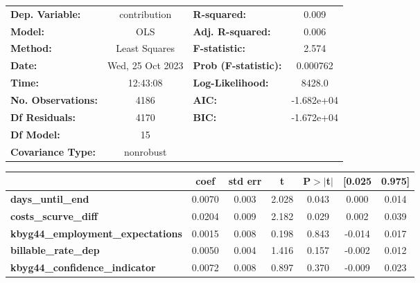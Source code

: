 \begin{center}
\begin{tabular}{lclc}
\toprule
\textbf{Dep. Variable:}                   &   contribution   & \textbf{  R-squared:         } &     0.009   \\
\textbf{Model:}                           &       OLS        & \textbf{  Adj. R-squared:    } &     0.006   \\
\textbf{Method:}                          &  Least Squares   & \textbf{  F-statistic:       } &     2.574   \\
\textbf{Date:}                            & Wed, 25 Oct 2023 & \textbf{  Prob (F-statistic):} &  0.000762   \\
\textbf{Time:}                            &     12:43:08     & \textbf{  Log-Likelihood:    } &    8428.0   \\
\textbf{No. Observations:}                &        4186      & \textbf{  AIC:               } & -1.682e+04  \\
\textbf{Df Residuals:}                    &        4170      & \textbf{  BIC:               } & -1.672e+04  \\
\textbf{Df Model:}                        &          15      & \textbf{                     } &             \\
\textbf{Covariance Type:}                 &    nonrobust     & \textbf{                     } &             \\
\bottomrule
\end{tabular}
\begin{tabular}{lcccccc}
                                          & \textbf{coef} & \textbf{std err} & \textbf{t} & \textbf{P$> |$t$|$} & \textbf{[0.025} & \textbf{0.975]}  \\
\midrule
\textbf{days\_until\_end}                 &       0.0070  &        0.003     &     2.028  &         0.043        &        0.000    &        0.014     \\
\textbf{costs\_scurve\_diff}              &       0.0204  &        0.009     &     2.182  &         0.029        &        0.002    &        0.039     \\
\textbf{kbyg44\_employment\_expectations} &       0.0015  &        0.008     &     0.198  &         0.843        &       -0.014    &        0.017     \\
\textbf{billable\_rate\_dep}              &       0.0050  &        0.004     &     1.416  &         0.157        &       -0.002    &        0.012     \\
\textbf{kbyg44\_confidence\_indicator}    &       0.0072  &        0.008     &     0.897  &         0.370        &       -0.009    &        0.023     \\

\end{tabular}
\end{center}
